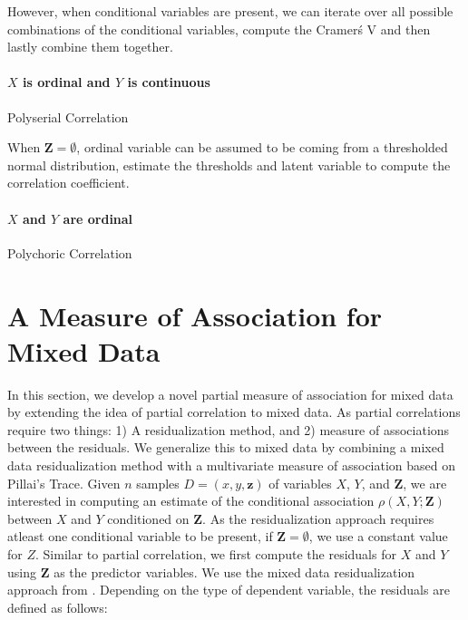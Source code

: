 \documentclass[letterpaper]{article} %
\begin{document}
However, when conditional variables are present, we can iterate over all
possible combinations of the conditional variables, compute the Cramer\'s V and
then lastly combine them together. 

\paragraph{$ X $ is ordinal and $ Y $ is continuous}
Polyserial Correlation

When $ \bm{Z} = \emptyset $, ordinal variable can be assumed to be coming from
a thresholded normal distribution, estimate the thresholds and latent variable
to compute the correlation coefficient.

\paragraph{$ X $ and $ Y $ are ordinal}
Polychoric Correlation

\section{A Measure of Association for Mixed Data}
\label{sec:mixed_association}

In this section, we develop a novel partial measure of association for mixed
data by extending the idea of partial correlation to mixed data. As partial
correlations require two things: 1) A residualization method, and 2) measure of
associations between the residuals. We generalize this to mixed data by combining a
mixed data residualization method \citep{Ankan2023} with a multivariate measure
of association based on Pillai's Trace. Given $ n $ samples $ D = (x, y,
\bm{z}) $ of variables $ X $, $ Y $, and $ \bm{Z} $, we are interested in
computing an estimate of the conditional association $ \rho(X, Y; \bm{Z}) $
between $ X $ and $ Y $ conditioned on $ \bm{Z} $. As the residualization
approach requires atleast one conditional variable to be present, if $ \bm{Z} =
\emptyset $, we use a constant value for $ Z $. Similar to partial correlation,
we first compute the residuals for $ X $ and $ Y $ using $ \bm{Z} $ as the
predictor variables. We use the mixed data residualization approach from
\citet{Ankan2023}. Depending on the type of dependent variable, the residuals
are defined as follows:
\end{document}
